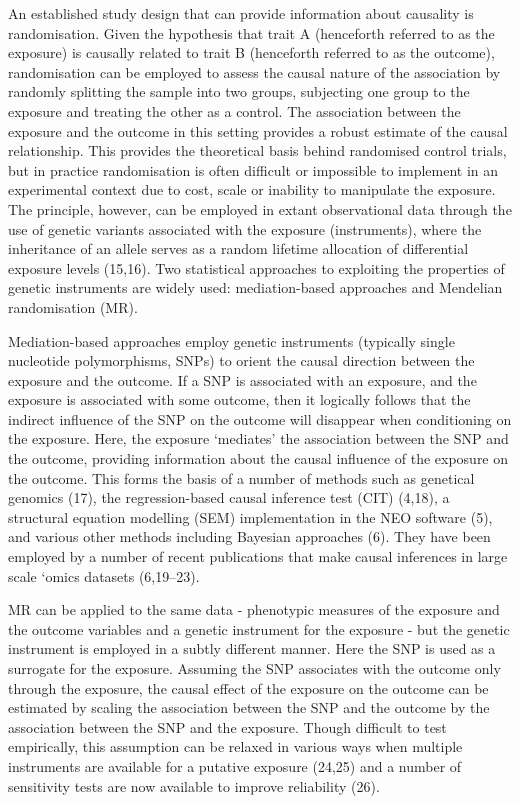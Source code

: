 \documentclass[]{article}
\begin{document}
An established study design that can provide information about causality
is randomisation. Given the hypothesis that trait A (henceforth referred
to as the exposure) is causally related to trait B (henceforth referred
to as the outcome), randomisation can be employed to assess the causal
nature of the association by randomly splitting the sample into two
groups, subjecting one group to the exposure and treating the other as a
control. The association between the exposure and the outcome in this
setting provides a robust estimate of the causal relationship. This
provides the theoretical basis behind randomised control trials, but in
practice randomisation is often difficult or impossible to implement in
an experimental context due to cost, scale or inability to manipulate
the exposure. The principle, however, can be employed in extant
observational data through the use of genetic variants associated with
the exposure (instruments), where the inheritance of an allele serves as
a random lifetime allocation of differential exposure levels (15,16).
Two statistical approaches to exploiting the properties of genetic
instruments are widely used: mediation-based approaches and Mendelian
randomisation (MR).

Mediation-based approaches employ genetic instruments (typically single
nucleotide polymorphisms, SNPs) to orient the causal direction between
the exposure and the outcome. If a SNP is associated with an exposure,
and the exposure is associated with some outcome, then it logically
follows that the indirect influence of the SNP on the outcome will
disappear when conditioning on the exposure. Here, the exposure
`mediates' the association between the SNP and the outcome, providing
information about the causal influence of the exposure on the outcome.
This forms the basis of a number of methods such as genetical genomics
(17), the regression-based causal inference test (CIT) (4,18), a
structural equation modelling (SEM) implementation in the NEO software
(5), and various other methods including Bayesian approaches (6). They
have been employed by a number of recent publications that make causal
inferences in large scale `omics datasets (6,19--23).

MR can be applied to the same data - phenotypic measures of the exposure
and the outcome variables and a genetic instrument for the exposure -
but the genetic instrument is employed in a subtly different manner.
Here the SNP is used as a surrogate for the exposure. Assuming the SNP
associates with the outcome only through the exposure, the causal effect
of the exposure on the outcome can be estimated by scaling the
association between the SNP and the outcome by the association between
the SNP and the exposure. Though difficult to test empirically, this
assumption can be relaxed in various ways when multiple instruments are
available for a putative exposure (24,25) and a number of sensitivity
tests are now available to improve reliability (26).
\end{document}
